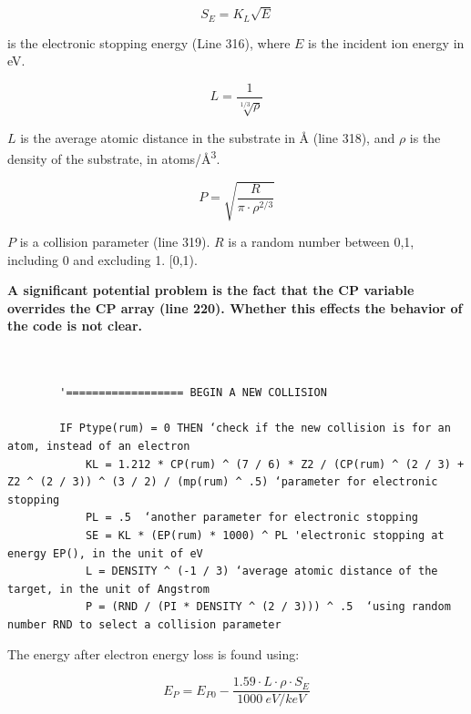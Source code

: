 \documentclass[10pt, reqno]{exam}
\begin{document}
\begin{equation}
    S_E = K_L \sqrt{E}
\end{equation}

is the electronic stopping energy (Line 316), where $E$ is the incident ion energy in eV. \par

\begin{equation}
    L = \frac{1}{\sqrt[1/3]{\rho}}
\end{equation}

$L$ is the average atomic distance in the substrate in \si{\angstrom} (line 318), and $\rho$ is the density of the substrate, in \si{atoms/\angstrom^{3}}. \par

\begin{equation}
    P = \sqrt{\frac{R}{\pi \cdot \rho^{2/3}}}
\end{equation}

$P$ is a collision parameter (line 319). $R$ is a random number between 0,1, including 0 and excluding 1. [0,1). \par

\textbf{A significant potential problem is the fact that the CP variable overrides the CP array (line 220). Whether this effects the behavior of the code is not clear.} \par

\begin{verbatim}   

    
        '================== BEGIN A NEW COLLISION
    
        IF Ptype(rum) = 0 THEN ‘check if the new collision is for an atom, instead of an electron
            KL = 1.212 * CP(rum) ^ (7 / 6) * Z2 / (CP(rum) ^ (2 / 3) + Z2 ^ (2 / 3)) ^ (3 / 2) / (mp(rum) ^ .5) ‘parameter for electronic stopping
            PL = .5  ‘another parameter for electronic stopping
            SE = KL * (EP(rum) * 1000) ^ PL 'electronic stopping at energy EP(), in the unit of eV
            L = DENSITY ^ (-1 / 3) ‘average atomic distance of the target, in the unit of Angstrom
            P = (RND / (PI * DENSITY ^ (2 / 3))) ^ .5  ‘using random number RND to select a collision parameter
\end{verbatim}

The energy after electron energy loss is found using:

\begin{equation}
    E_P = E_{P0} - \frac{1.59\cdot L \cdot \rho \cdot S_E}{\SI{1000}{eV/keV}}
\end{equation}
\end{document}

